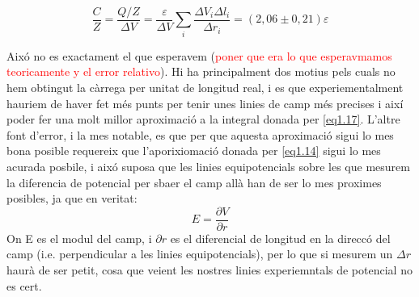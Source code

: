 \documentclass[a4paper,10.5pt]{report}
\begin{document}
\begin{equation}
	\frac{C}{Z} = \frac{Q/Z}{\Delta V} = \frac{\varepsilon}{\Delta V} \sum_i \frac{\Delta V_i \Delta l_i}{\Delta r_i} = (2,06 \pm 0,21)\varepsilon 
\end{equation}

Aixó no es exactament el que esperavem (\textcolor{red}{poner que era lo que esperavmamos teoricamente y el error relativo}). Hi ha principalment dos motius pels cuals no hem obtingut la càrrega per unitat de longitud real, i es que experiementalment hauriem de haver fet més punts per tenir unes linies de camp més precises i així poder fer una molt millor aproximació a la integral donada per \eqref{eq1.17}. L'altre font d'error, i la mes notable, es que per que aquesta aproximació sigui lo mes bona posible requereix que l'aporixiomació donada per \eqref{eq1.14} sigui lo mes acurada posbile, i aixó suposa que les linies equipotencials sobre les que mesurem la diferencia de potencial per sbaer el camp allà han de ser lo mes proximes posibles, ja que en veritat:
\begin{equation}
	E = \frac{\partial V}{\partial r}
\end{equation}
On E es el modul del camp, i $\partial r$ es el diferencial de longitud en la direccó del camp (i.e. perpendicular a les linies equipotencials), per lo que si mesurem un  $\Delta r$ haurà de ser petit, cosa que veient les nostres linies experiemntals de potencial no es cert.
\end{document}
